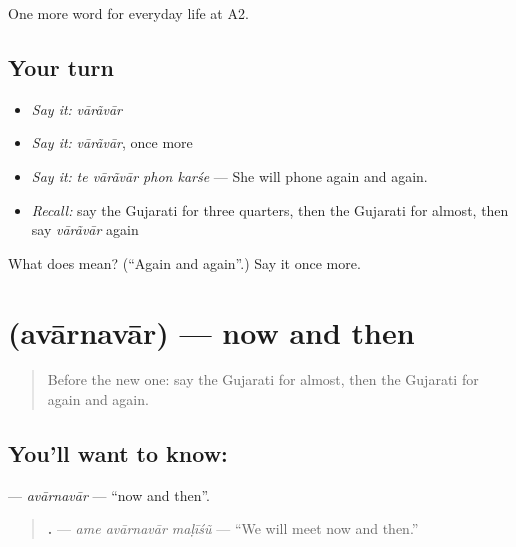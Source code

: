 \begin{grammarlens}[title={What you've built}]
One more word for everyday life at A2.
\end{grammarlens}

\subsection*{Your turn}
\begin{itemize}
\raggedright
  \item \emph{Say it:} \emph{vārãvār}
  \item \emph{Say it:} \emph{vārãvār}, once more
  \item \emph{Say it:} \emph{te vārãvār phon karśe} — She will phone again and again.
  \item \emph{Recall:} say the Gujarati for three quarters, then the Gujarati for almost, then say \emph{vārãvār} again
\end{itemize}

\begin{tcolorbox}[breakable,colback=teal!4,colframe=teal!35!black,title={Before you move on}]
What does  mean? (\textquotedblleft{}Again and again\textquotedblright{}.) Say it once more.
\end{tcolorbox}
\section[\texorpdfstring{\gu{અવારનવાર} (avārnavār)}{અવારનવાર (avārnavār)}]{ (avārnavār) — now and then}

\label{lesson:GU-C177-avarnavar}



\begin{quote}
Before the new one: say the Gujarati for almost, then the Gujarati for again and again.
\end{quote}

\subsection*{You'll want to know: }
\textbf{} — \emph{avārnavār} — \textquotedblleft{}now and then\textquotedblright{}.

\begin{quote}
\textbf{  .} — \emph{ame avārnavār maḷīśũ} — \textquotedblleft{}We will meet now and then.\textquotedblright{}
\end{quote}

